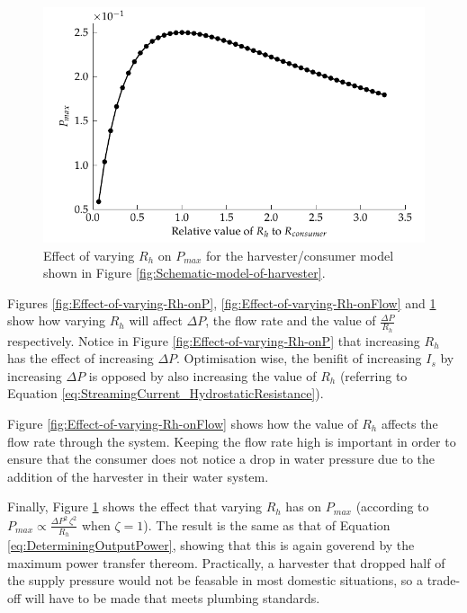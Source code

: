 \begin{figure} \begin{centering}
        \includegraphics{content/pt1/01-PowerHarvesting/graphics/streamingCell_consumerModel_total}
        \par\end{centering}

\protect\caption{\label{fig:Effect-of-varying-Rh-onIs}Effect of varying $R_{h}$
    on \foreignlanguage{english}{$P_{max}$} for the harvester/consumer model
    shown in Figure \ref{fig:Schematic-model-of-harvester}.} \end{figure}
Figures \ref{fig:Effect-of-varying-Rh-onP},
\ref{fig:Effect-of-varying-Rh-onFlow} and \ref{fig:Effect-of-varying-Rh-onIs}
show how varying $R_{h}$ will affect $\Delta P$, the flow rate and the value of
$\frac{\Delta P}{R_{h}}$ respectively. Notice in Figure
\ref{fig:Effect-of-varying-Rh-onP} that increasing $R_{h}$ has the effect of
increasing $\Delta P$.  Optimisation wise, the benifit of increasing $I_{s}$ by
increasing $\Delta P$ is opposed by also increasing the value of $R_{h}$
(referring to Equation \ref{eq:StreamingCurrent_HydrostaticResistance}).

Figure \ref{fig:Effect-of-varying-Rh-onFlow} shows how the value of $R_{h}$
affects the flow rate through the system. Keeping the flow rate high is
important in order to ensure that the consumer does not notice a drop in water
pressure due to the addition of the harvester in their water system.

Finally, Figure \ref{fig:Effect-of-varying-Rh-onIs} shows the effect that
varying $R_{h}$ has on \foreignlanguage{english}{$P_{max}$} (according to
$P_{max}\propto\frac{\Delta P^{2}\,\zeta^{2}}{R_{h}}$ when $\zeta=1$). The
result is the same as that of Equation \ref{eq:DeterminingOutputPower}, showing
that this is again goverend by the maximum power transfer thereom. Practically,
a harvester that dropped half of the supply pressure would not be feasable in
most domestic situations, so a trade-off will have to be made that meets
plumbing standards.


